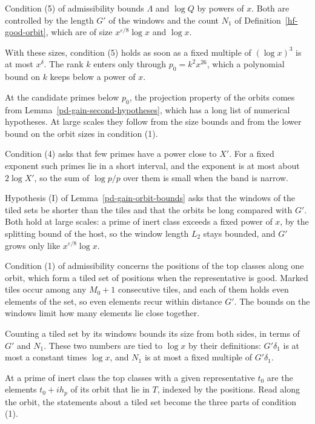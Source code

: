 Condition (5) of admissibility bounds $\Lambda$ and $\log Q$ by powers of $x$. Both are controlled by
the length $G'$ of the windows and the count $N_1$ of Definition~\ref{hf-good-orbit}, which are of
size $x^{\varepsilon/8}\log x$ and $\log x$.

With these sizes, condition (5) holds as soon as a fixed multiple of $(\log x)^3$ is at most
$x^\delta$. The rank $k$ enters only through $p_0=k^2x^{26}$, which a polynomial bound on $k$ keeps
below a power of $x$.

At the candidate primes below $p_0$, the projection property of the orbits comes from
Lemma~\ref{pd-gain-second-hypotheses}, which has a long list of numerical hypotheses. At large scales
they follow from the size bounds and from the lower bound on the orbit sizes in condition (1).

Condition (4) asks that few primes have a power close to $X'$. For a fixed exponent such primes lie
in a short interval, and the exponent is at most about $2\log X'$, so the sum of $\log p/p$ over them
is small when the band is narrow.

Hypothesis (I) of Lemma~\ref{pd-gain-orbit-bounds} asks that the windows of the tiled sets be shorter
than the tiles and that the orbits be long compared with $G'$. Both hold at large scales: a prime of
inert class exceeds a fixed power of $x$, by the splitting bound of the host, so the window length
$L_2$ stays bounded, and $G'$ grows only like $x^{\varepsilon/8}\log x$.

Condition (1) of admissibility concerns the positions of the top classes along one orbit, which form
a tiled set of positions when the representative is good. Marked tiles occur among any $M_0+1$
consecutive tiles, and each of them holds even elements of the set, so even elements recur within
distance $G'$. The bounds on the windows limit how many elements lie close together.

Counting a tiled set by its windows bounds its size from both sides, in terms of $G'$ and $N_1$. These
two numbers are tied to $\log x$ by their definitions: $G'\delta_1$ is at most a constant times
$\log x$, and $N_1$ is at most a fixed multiple of $G'\delta_1$.

At a prime of inert class the top classes with a given representative $t_0$ are the elements
$t_0+ih_p$ of its orbit that lie in $T$, indexed by the positions. Read along the orbit, the
statements about a tiled set become the three parts of condition (1).

